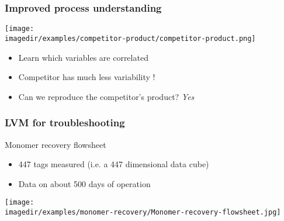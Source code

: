 \begin{frame}\frametitle{Improved process understanding}

	\texttt{[image: \\imagedir/examples/competitor-product/competitor-product.png]}
	\begin{itemize}
		\item	Learn which variables are correlated
		\item	Competitor has much less variability !
		\item	Can we reproduce the competitor's product? \emph{Yes}
	\end{itemize}
\end{frame}



\begin{frame}\frametitle{LVM for troubleshooting}

	Monomer recovery flowsheet
	\begin{itemize}
		\item	447 tags measured (i.e. a 447 dimensional data cube)
		\item	Data on about 500 days of operation
	\end{itemize}

	\texttt{[image: \\imagedir/examples/monomer-recovery/Monomer-recovery-flowsheet.jpg]}
\end{frame}

